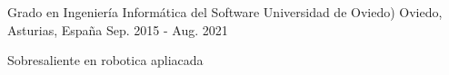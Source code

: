 

\begin{cventries}

  \cventry
    {Grado en Ingeniería Informática del Software} %
    {Universidad de Oviedo)} %
    {Oviedo, Asturias, España} %
    {Sep. 2015 - Aug. 2021} %
    {
      \begin{cvitems} %
        \item {Sobresaliente en robotica apliacada}
      \end{cvitems}
    }

\end{cventries}
